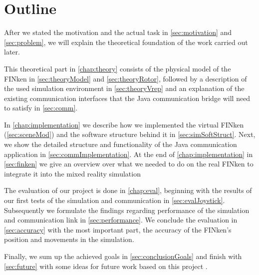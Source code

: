         
\section{Outline}
    After we stated the motivation and the actual task in \ref{sec:motivation} and \ref{sec:problem}, we will explain the theoretical foundation of the work carried out later.
    
    This theoretical part in \ref{chap:theory} consists of the physical model of the FINken in \ref{sec:theoryModel} and \ref{sec:theoryRotor}, followed by a description of the used simulation environment in \ref{sec:theoryVrep} and an explanation of the existing communication interfaces that the Java communication bridge will need to satisfy in \ref{sec:comm}.
    
    In \ref{chap:implementation} we describe how we implemented the virtual FINken (\ref{sec:sceneMod}) and the software structure behind it in \ref{sec:simSoftStruct}. 
    Next, we show the detailed structure and functionality of the Java communication application in \ref{sec:commImplementation}.
    At the end of \ref{chap:implementation} in \ref{sec:finken} we give an overview over what we needed to do on the real FINken to integrate it into the mixed reality simulation
    
    The evaluation of our project is done in \ref{chap:eval}, beginning with the results of our first tests of the simulation and communication in \ref{sec:evalJoystick}.
    Subsequently we formulate the findings regarding performance of the simulation and communication link in \ref{sec:performance}.
    We conclude the evaluation in \ref{sec:accuracy} with the most important part, the accuracy of the FINken's position and movements in the simulation.
    
    Finally, we sum up the achieved goals in \ref{sec:conclusionGoals} and finish with \ref{sec:future} with some ideas for future work based on this project . 
    